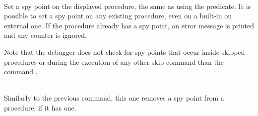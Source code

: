 \begin{descr}{1cm}
\\
Set a spy point on the displayed procedure, the same as using the
 predicate.
It is possible to set a spy point on any existing procedure,
even on a built-in on external one.
If the procedure already has a spy point, an error message is printed
and any counter is ignored.

Note that the debugger does not check for spy points that occur inside
skipped procedures or during the execution of any other skip command
than the  command .

\\
Similarly to the previous command, this one removes a spy point
from a procedure, if it has one.



\end{descr}
